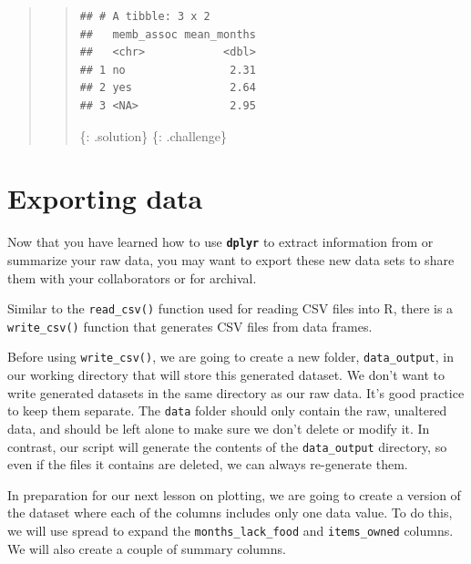 \documentclass[]{book}
\newenvironment{Shaded}{\begin{snugshade}}{\end{snugshade}}
\newcommand{\KeywordTok}[1]{\textcolor[rgb]{0.13,0.29,0.53}{\textbf{#1}}}
\newcommand{\DataTypeTok}[1]{\textcolor[rgb]{0.13,0.29,0.53}{#1}}
\newcommand{\StringTok}[1]{\textcolor[rgb]{0.31,0.60,0.02}{#1}}
\newcommand{\OperatorTok}[1]{\textcolor[rgb]{0.81,0.36,0.00}{\textbf{#1}}}
\newcommand{\NormalTok}[1]{#1}
\begin{document}
\begin{quote}
\begin{quote}
\begin{Shaded}
\end{Shaded}

\begin{verbatim}
## # A tibble: 3 x 2
##   memb_assoc mean_months
##   <chr>            <dbl>
## 1 no                2.31
## 2 yes               2.64
## 3 <NA>              2.95
\end{verbatim}

\{: .solution\} \{: .challenge\}
\end{quote}
\end{quote}

\section{Exporting data}\label{exporting-data}

Now that you have learned how to use \textbf{\texttt{dplyr}} to extract
information from or summarize your raw data, you may want to export
these new data sets to share them with your collaborators or for
archival.

Similar to the \texttt{read\_csv()} function used for reading CSV files
into R, there is a \texttt{write\_csv()} function that generates CSV
files from data frames.

Before using \texttt{write\_csv()}, we are going to create a new folder,
\texttt{data\_output}, in our working directory that will store this
generated dataset. We don't want to write generated datasets in the same
directory as our raw data. It's good practice to keep them separate. The
\texttt{data} folder should only contain the raw, unaltered data, and
should be left alone to make sure we don't delete or modify it. In
contrast, our script will generate the contents of the
\texttt{data\_output} directory, so even if the files it contains are
deleted, we can always re-generate them.

In preparation for our next lesson on plotting, we are going to create a
version of the dataset where each of the columns includes only one data
value. To do this, we will use spread to expand the
\texttt{months\_lack\_food} and \texttt{items\_owned} columns. We will
also create a couple of summary columns.
\end{document}
